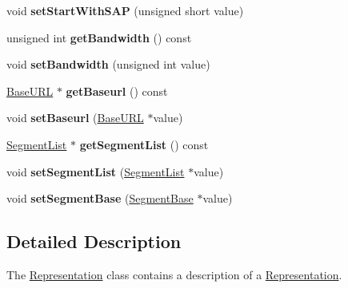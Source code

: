 \begin{DoxyCompactItemize}
\item 
\hypertarget{class_representation_a16ec43f250f1082f563b4bb05a0f4565}{void {\bfseries set\-Start\-With\-S\-A\-P} (unsigned short value)}\label{class_representation_a16ec43f250f1082f563b4bb05a0f4565}

\item 
\hypertarget{class_representation_ac0b5cf15746aea6cf43402c920124229}{unsigned int {\bfseries get\-Bandwidth} () const }\label{class_representation_ac0b5cf15746aea6cf43402c920124229}

\item 
\hypertarget{class_representation_a5b4f51f1fe3a8ee56995b732d3f240b7}{void {\bfseries set\-Bandwidth} (unsigned int value)}\label{class_representation_a5b4f51f1fe3a8ee56995b732d3f240b7}

\item 
\hypertarget{class_representation_ac98b7e695c72f779fa526295178f0250}{\hyperlink{class_base_u_r_l}{Base\-U\-R\-L} $\ast$ {\bfseries get\-Baseurl} () const }\label{class_representation_ac98b7e695c72f779fa526295178f0250}

\item 
\hypertarget{class_representation_ad41ecf11e7bc0df85d4783a1584d2f03}{void {\bfseries set\-Baseurl} (\hyperlink{class_base_u_r_l}{Base\-U\-R\-L} $\ast$value)}\label{class_representation_ad41ecf11e7bc0df85d4783a1584d2f03}

\item 
\hypertarget{class_representation_affd2bb951e1e0521a314111ce2bf5853}{\hyperlink{class_segment_list}{Segment\-List} $\ast$ {\bfseries get\-Segment\-List} () const }\label{class_representation_affd2bb951e1e0521a314111ce2bf5853}

\item 
\hypertarget{class_representation_ae4ce85864f025ac1c01c71cdc19fa4e0}{void {\bfseries set\-Segment\-List} (\hyperlink{class_segment_list}{Segment\-List} $\ast$value)}\label{class_representation_ae4ce85864f025ac1c01c71cdc19fa4e0}

\item 
\hypertarget{class_representation_a871d457a4f692048dc29410f72ca87e8}{void {\bfseries set\-Segment\-Base} (\hyperlink{class_segment_base}{Segment\-Base} $\ast$value)}\label{class_representation_a871d457a4f692048dc29410f72ca87e8}

\end{DoxyCompactItemize}


\subsection{Detailed Description}
The \hyperlink{class_representation}{Representation} class contains a description of a \hyperlink{class_representation}{Representation}. 


